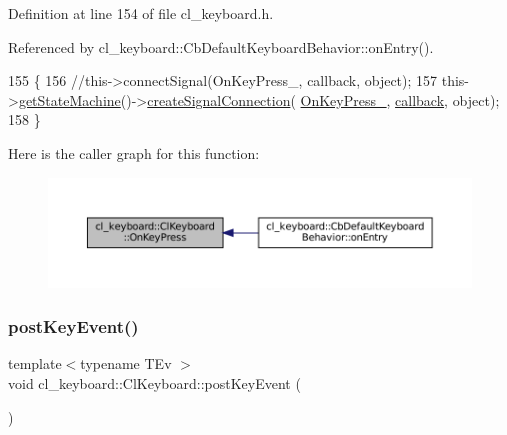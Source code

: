 Definition at line 154 of file cl\+\_\+keyboard.\+h.



Referenced by cl\+\_\+keyboard\+::\+Cb\+Default\+Keyboard\+Behavior\+::on\+Entry().


\begin{DoxyCode}
155         \{
156                 \textcolor{comment}{//this->connectSignal(OnKeyPress\_, callback, object);}
157                 this->\hyperlink{classsmacc_1_1ISmaccClient_aec51d4712404cb9882b86e4c854bb93a}{getStateMachine}()->\hyperlink{classsmacc_1_1ISmaccStateMachine_adf0f42ade0c65cc471960fe2a7c42da2}{createSignalConnection}(
      \hyperlink{classcl__keyboard_1_1ClKeyboard_ae7fb61a86ed9cdd313f0cc1b2661c63c}{OnKeyPress\_}, \hyperlink{sm__ridgeback__barrel__search__1_2servers_2opencv__perception__node_2opencv__perception__node_8cpp_a050e697bd654facce10ea3f6549669b3}{callback}, \textcolor{keywordtype}{object});
158         \}
\end{DoxyCode}
Here is the caller graph for this function\+:
\nopagebreak
\begin{figure}[H]
\begin{center}
\leavevmode
\includegraphics[width=350pt]{classcl__keyboard_1_1ClKeyboard_ae9f4a6dc1ce18397394a432826970baa_icgraph}
\end{center}
\end{figure}
\mbox{\label{classcl__keyboard_1_1ClKeyboard_ac1311ce9a6a64e590df2e1b088f0e733}} 
\subsubsection{\texorpdfstring{post\+Key\+Event()}{postKeyEvent()}}
{\footnotesize\ttfamily template$<$typename T\+Ev $>$ \\
void cl\+\_\+keyboard\+::\+Cl\+Keyboard\+::post\+Key\+Event (\begin{DoxyParamCaption}{ }\end{DoxyParamCaption})\hspace{0.3cm}{\ttfamily [inline]}}



